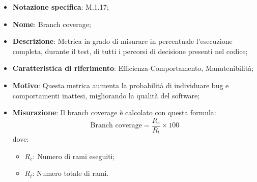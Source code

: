\begin{itemize}
    \item \textbf{Notazione specifica}: M.1.17;
    \item \textbf{Nome}: Branch coverage;
    \item \textbf{Descrizione}: Metrica in grado di misurare in percentuale l'esecuzione completa, durante il test, di tutti i percorsi di decisione presenti nel codice;
    \item \textbf{Caratteristica di riferimento}: Efficienza-Comportamento, Manutenibilità;
    \item \textbf{Motivo}: Questa metrica aumenta la probabilità di individuare bug e comportamenti inattesi, migliorando la qualità del software;
    \item \textbf{Misurazione}: Il branch coverage è calcolato con questa formula:
    \[
        \text{Branch coverage} = \frac{R_{e}}{R_{t}} \times 100
    \]
    dove:
    \begin{itemize}
        \item $R_{e}$: Numero di rami eseguiti;
        \item $R_{t}$: Numero totale di rami.
    \end{itemize}

\end{itemize}